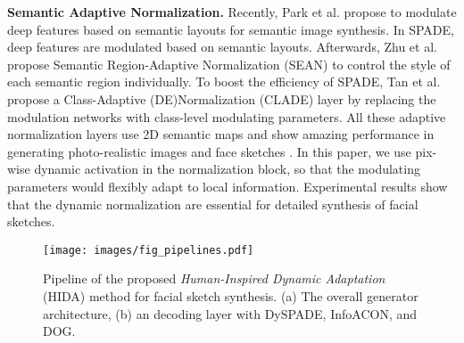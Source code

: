 \documentclass[10pt,twocolumn,letterpaper]{article}
\begin{document}
\textbf{Semantic Adaptive Normalization.} 
\label{ssec:spade}
Recently, Park et al. \cite{Park2019GauGAN} propose to modulate deep features based on semantic layouts for semantic image synthesis. In SPADE, deep features are modulated based on semantic layouts. Afterwards, Zhu et al. \cite{zhu2020sean} propose Semantic Region-Adaptive Normalization (SEAN) to control the style of each semantic region individually. 
To boost the efficiency of SPADE, Tan et al. \cite{tan2021diverse} propose a Class-Adaptive (DE)Normalization (CLADE) layer by replacing the modulation networks with class-level modulating parameters. 
All these adaptive normalization layers use 2D semantic maps and show amazing performance in generating photo-realistic images \cite{lv2021learning} and face sketches \cite{gao2020cagan}. 
In this paper, we use pix-wise dynamic activation in the normalization block, so that the modulating parameters would flexibly adapt to local information. 
Experimental results show that the dynamic normalization are essential for detailed synthesis of facial sketches.  %



\begin{figure*}[ht]
	\centering
	\texttt{[image: images/fig\_pipelines.pdf]} 
	\caption{Pipeline of the proposed \textit{Human-Inspired Dynamic Adaptation} (HIDA) method for facial sketch synthesis. (a) The overall generator architecture, (b) an decoding layer with DySPADE, InfoACON, and DOG.}
	\label{fig:pipeline}
\end{figure*}
\end{document}
